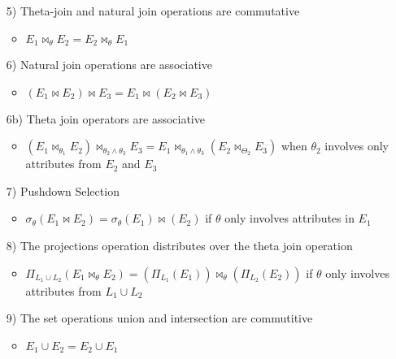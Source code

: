 \begin{itemize}
\begin{itemize}
\begin{itemize}
                    \item[5)] Theta-join and natural join operations are commutative
                        \begin{itemize}
                            \item $E_1 \bowtie_\theta E_2 = E_2 \bowtie_\theta E_1$
                        \end{itemize}
                    \item[6)] Natural join operations are associative
                        \begin{itemize}
                            \item $(E_1 \bowtie E_2) \bowtie E_3 = E_1 \bowtie (E_2 \bowtie E_3)$
                        \end{itemize}
                    \item[6b)] Theta join operators are associative
                        \begin{itemize}
                            \item $(E_1 \bowtie_{\theta_1} E_2) \bowtie_{\theta_2 \wedge \theta_3} E_3 = E_1 \bowtie_{\theta_1 \wedge \theta_3}(E_2 \bowtie_{\Theta_2} E_3)$ when $\theta_2$ involves only attributes from $E_2$ and $E_3$
                        \end{itemize}
                    \item[7)] Pushdown Selection
                        \begin{itemize}
                            \item $\sigma_\theta(E_1 \bowtie E_2) = \sigma_\theta(E_1) \bowtie (E_2)$ if $\theta$ only involves attributes in $E_1$
                        \end{itemize}
                    \item[8)] The projections operation distributes over the theta join operation
                        \begin{itemize}
                            \item $\Pi_{L_1 \cup L_2}(E_1 \bowtie_\theta E_2) = (\Pi_{L_1}(E_1)) \bowtie_\theta(\Pi_{L_2}(E_2))$ if $\theta$ only involves attributes from $L_1 \cup L_2$
                        \end{itemize}
                    \item[9)] The set operations union and intersection are commutitive
                        \begin{itemize}
                            \item $E_1 \cup E_2 = E_2 \cup E_1$

\end{itemize}
\end{itemize}
\end{itemize}
\end{itemize}

